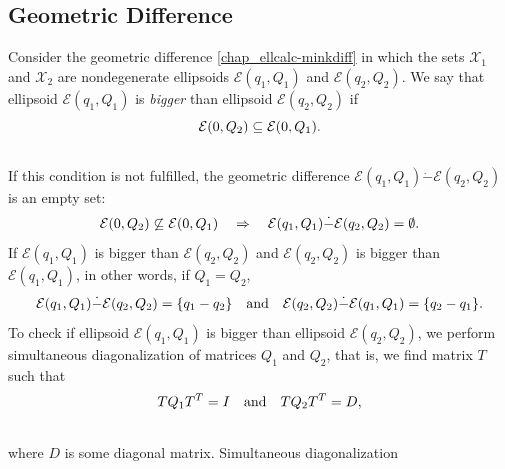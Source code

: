 \documentclass[letterpaper,10pt,english]{sphinxmanual}
\begin{document}
\subsection{Geometric Difference}
\label{chap_ellcalc:geometric-difference}
Consider the geometric difference \eqref{chap_ellcalc-minkdiff} in which the sets
${\mathcal X}_1$ and ${\mathcal X}_2$ are nondegenerate
ellipsoids ${\mathcal E}(q_1,Q_1)$ and
${\mathcal E}(q_2,Q_2)$. We say that ellipsoid
${\mathcal E}(q_1,Q_1)$ is \emph{bigger} than ellipsoid
${\mathcal E}(q_2,Q_2)$ if
\begin{gather}
\begin{split}{\mathcal E}(0,Q_2) \subseteq {\mathcal E}(0,Q_1).\end{split}\notag\\\begin{split}\end{split}\notag
\end{gather}
If this condition is not fulfilled, the geometric difference
${\mathcal E}(q_1,Q_1)\dot{-}{\mathcal E}(q_2,Q_2)$ is an empty
set:
\begin{gather}
\begin{split}{\mathcal E}(0,Q_2) \not\subseteq {\mathcal E}(0,Q_1) ~~~ \Rightarrow ~~~
{\mathcal E}(q_1,Q_1) \dot{-}{\mathcal E}(q_2,Q_2) = \emptyset.\end{split}\notag
\end{gather}
If ${\mathcal E}(q_1,Q_1)$ is bigger than
${\mathcal E}(q_2,Q_2)$ and ${\mathcal E}(q_2,Q_2)$ is
bigger than ${\mathcal E}(q_1,Q_1)$, in other words, if
$Q_1=Q_2$,
\begin{gather}
\begin{split}{\mathcal E}(q_1,Q_1) \dot{-}{\mathcal E}(q_2,Q_2) = \{q_1-q_2\} ~~~ \mbox{and} ~~~
{\mathcal E}(q_2,Q_2) \dot{-}{\mathcal E}(q_1,Q_1) = \{q_2-q_1\}.\end{split}\notag
\end{gather}
To check if ellipsoid ${\mathcal E}(q_1,Q_1)$ is bigger than
ellipsoid ${\mathcal E}(q_2,Q_2)$, we perform simultaneous
diagonalization of matrices $Q_1$ and $Q_2$, that is, we
find matrix $T$ such that
\begin{gather}
\begin{split}TQ_1T^T = I ~~~ \mbox{and} ~~~ TQ_2T^T=D,\end{split}\notag\\\begin{split}\end{split}\notag
\end{gather}
where $D$ is some diagonal matrix. Simultaneous diagonalization
\end{document}
